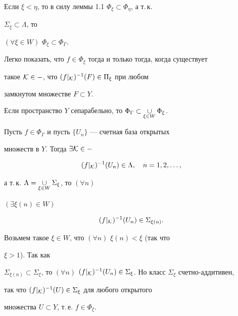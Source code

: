  


Если $\xi<\eta$, то в силу леммы 1.1 $\Phi_\xi\subset \Phi_\eta$, а т.\,к. 


$\Sigma_\xi\subset\Lambda$, то 


$(\forall \xi\in W)$ $\Phi_\xi\subset\Phi_\Gamma$. 


 


Легко показать, что $f\in\Phi_\xi$ тогда и только тогда, когда существует 


такое $\cal K\in\Gamma$, что $(f|_{\cal K})^{-1}(F)\in\Pi_\xi$ при любом 


замкнутом множестве $F\subset Y$. 


 


\begin{props} 


Если пространство $Y$ сепарабельно, то $\Phi_\Gamma\subset 


\mycup_{\xi\in W}\Phi_\xi$. 


\end{props} 


 


\begin{pf} 


Пусть $f\in\Phi_\Gamma$ и пусть $\{U_n\}$ --- счетная база открытых 


множеств в $Y$. Тогда $\exists\cal K\in\Gamma$ 


$$ 


(f|_{\cal K})^{-1}(U_n)\in\Lambda,\quad n=1,2,\dotsc, 


$$ 


а т.\,к. $\Lambda=\mathop{\cup}\limits_{\xi\in W}\Sigma_\xi$, то $(\forall n)$ 


$(\exists\xi(n)\in W)$ 


$$ 


(f|_{\cal K})^{-1}(U_n)\in\Sigma_{\xi(n)}. 


$$ 


Возьмем такое $\xi\in W$, что $(\forall n)$ $\xi(n)<\xi$ (так что 


$\xi>1$). Так как 


$\Sigma_{\xi(n)}\subset\Sigma_\xi$, то $(\forall n)$ $(f|_{\cal 


K})^{-1}(U_n)\in\Sigma_\xi$. Но класс $\Sigma_\xi$ счетно-аддитивен, 


так что $(f|_{\cal K})^{-1}(U)\in\Sigma_\xi$ для любого открытого 


множества $U\subset Y$, т.\,е. $f\in\Phi_\xi$. 


\end{pf} 


